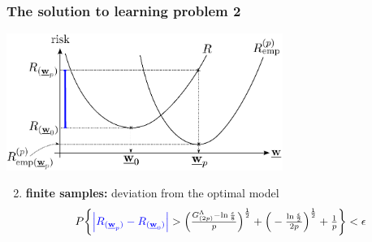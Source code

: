  


\begin{frame}\frametitle{The solution to learning problem 2} 
	\begin{center}
		\includegraphics[width=9cm]{img/section2_fig1_question1}
	\end{center}
	\begin{enumerate}\setcounter{enumi}{1}
		\item \textbf{finite samples:} deviation from the optimal model
			\vspace{-2mm}
			\begin{equation}
				P\bigg\{ {%
				{\color{blue}\Big| R_{(\vec w_p)} - R_{(\vec w_0)} \Big|} }
					> \Big(\smallfrac{G^\Lambda_{(2p)} 
						- \ln \frac{\epsilon}{8}}{p} \Big)^\frac{1}{2}
					+ \Big(-\smallfrac{\ln \frac{\epsilon}{2}}{2p} 
						\Big)^\frac{1}{2} + \smallfrac{1}{p}
				\bigg\} < \epsilon
					\label{eq:boundgenerlizationdeviation}
			\end{equation}
			\vspace{-4mm}
	\end{enumerate}
\end{frame}

